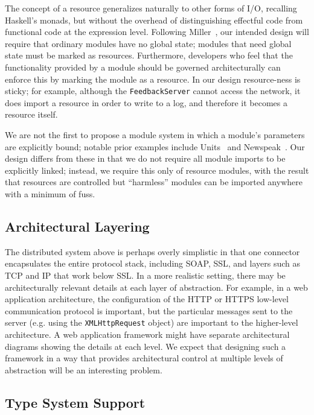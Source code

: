 \documentclass[runningheads]{llncs}
\begin{document}
\begin{sloppypar}
The concept of a resource generalizes naturally to other forms of I/O, recalling Haskell's monads, but without the overhead of distinguishing effectful code from functional code at the expression level.  Following Miller~\cite{MarkMiller-E}, our intended design will require that ordinary modules have no global state; modules that need global state must be marked as resources.  Furthermore, developers who feel that the functionality provided by a module should be governed architecturally can enforce this by marking the module as a resource.  In our design resource-ness is sticky; for example, although the \texttt{FeedbackServer} cannot access the network, it does import a resource in order to write to a log, and therefore it becomes a resource itself.

We are not the first to propose a module system in which a module's parameters are explicitly bound; notable prior examples include Units~\cite{FF98} and Newspeak~\cite{BrachaNewspeakModules}.  Our design differs from these in that we do not require all module imports to be explicitly linked; instead, we require this only of resource modules, with the result that resources are controlled but ``harmless'' modules can be imported anywhere with a minimum of fuss.

\subsection{Architectural Layering}

The distributed system above is perhaps overly simplistic in that one connector encapsulates the entire protocol stack, including SOAP, SSL, and layers such as TCP and IP that work below SSL.  In a more realistic setting, there may be architecturally relevant details at each layer of abstraction.  For example, in a web application architecture, the configuration of the HTTP or HTTPS low-level communication protocol is important, but the particular messages sent to the server (e.g. using the \texttt{XMLHttpRequest} object) are important to the higher-level architecture.  A web application framework might have separate architectural diagrams showing the details at each level.  We expect that designing such a framework in a way that provides architectural control at multiple levels of abstraction will be an interesting problem.


\subsection{Type System Support}


\end{sloppypar}
\end{document}
